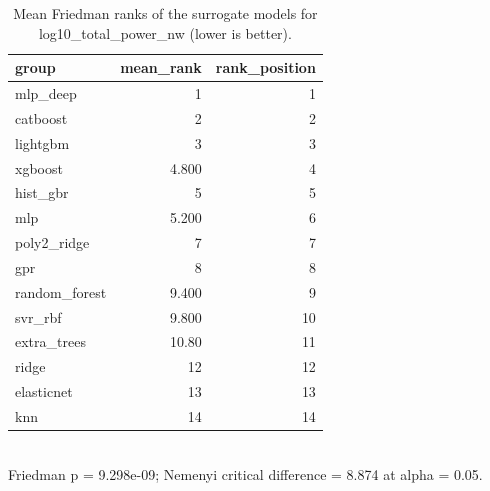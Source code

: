 \begin{table}[!t]
\centering
\caption{Mean Friedman ranks of the surrogate models for log10_total_power_nw (lower is better).}
\label{tab:statistics_surrogate_ranks_surrogate_log10_total_power_nw}
\footnotesize
\begin{tabular}{lrr}
\toprule
group & mean\_rank & rank\_position \\
\midrule
mlp\_deep & 1 & 1 \\
catboost & 2 & 2 \\
lightgbm & 3 & 3 \\
xgboost & 4.800 & 4 \\
hist\_gbr & 5 & 5 \\
mlp & 5.200 & 6 \\
poly2\_ridge & 7 & 7 \\
gpr & 8 & 8 \\
random\_forest & 9.400 & 9 \\
svr\_rbf & 9.800 & 10 \\
extra\_trees & 10.80 & 11 \\
ridge & 12 & 12 \\
elasticnet & 13 & 13 \\
knn & 14 & 14 \\
\bottomrule
\end{tabular}
\\[2pt] \footnotesize Friedman p = 9.298e-09; Nemenyi critical difference = 8.874 at alpha = 0.05.
\end{table}
